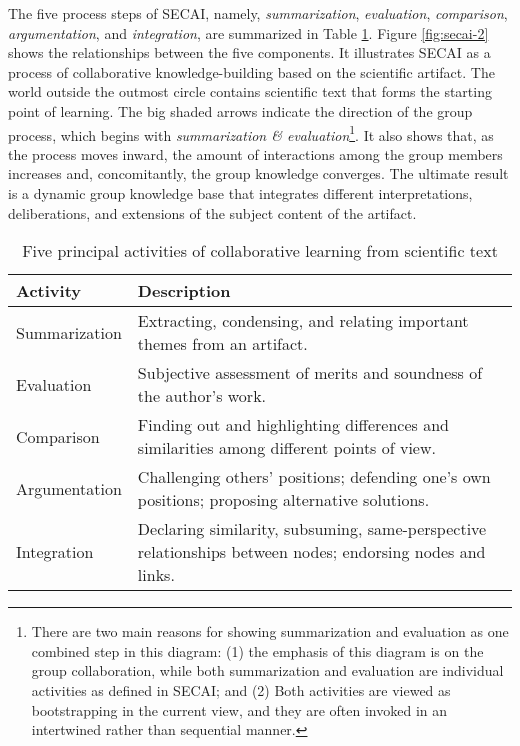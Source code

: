 The five process steps of SECAI, namely, {\it summarization\/}, {\it
evaluation\/}, {\it comparison\/}, {\it argumentation\/}, and {\it
integration\/}, are summarized in Table \ref{tab:secai}. Figure
\ref{fig:secai-2} shows the relationships between the five components. It
illustrates SECAI as a process of collaborative knowledge-building based on
the scientific artifact. The world outside the outmost circle contains
scientific text that forms the starting point of learning. The big shaded
arrows indicate the direction of the group process, which begins with {\it
summarization \& evaluation\/}\footnote{There are two main reasons for
showing summarization and evaluation as one combined step in this diagram:
(1) the emphasis of this diagram is on the group collaboration, while both
summarization and evaluation are individual activities as defined in SECAI;
and (2) Both activities are viewed as bootstrapping in the current view,
and they are often invoked in an intertwined rather than sequential
manner.}. It also shows that, as the process moves inward, the amount of
interactions among the group members increases and, concomitantly, the
group knowledge converges.  The ultimate result is a dynamic group
knowledge base that integrates different interpretations, deliberations,
and extensions of the subject content of the artifact.

\small
\begin{table}
  \caption{Five principal activities of collaborative learning from
  scientific text}
  \begin{center}
    \begin{tabular} {||l|p{4.5in}||} \hline   
      
      {\bf Activity} & {\bf Description} \\ \hline
      
      Summarization & Extracting, condensing, and relating important
      themes from an artifact. \\ \hline
      
      Evaluation & Subjective assessment of merits and soundness of the
      author's work. \\ \hline
      
      Comparison & Finding out and highlighting differences and
      similarities among different points of view. \\ \hline

      Argumentation & Challenging others' positions; defending one's
      own positions; proposing alternative solutions. \\ \hline
      
      Integration & Declaring similarity, subsuming, same-perspective
      relationships between nodes; endorsing nodes and links. \\
      \hline
    \end{tabular}    
  \end{center}
    \label{tab:secai}
\end{table}
\normalsize
{}

